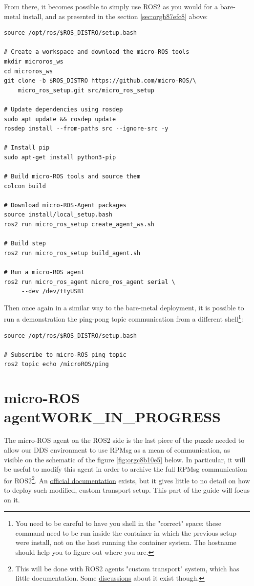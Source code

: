 \documentclass[10pt]{article}
\begin{document}
From there, it becomes possible to simply use ROS2 as you would for a bare-metal install,
and as presented in the section \ref{sec:orgb87efc8} above:
\begin{verbatim}
source /opt/ros/$ROS_DISTRO/setup.bash

# Create a workspace and download the micro-ROS tools
mkdir microros_ws
cd microros_ws
git clone -b $ROS_DISTRO https://github.com/micro-ROS/\
    micro_ros_setup.git src/micro_ros_setup

# Update dependencies using rosdep
sudo apt update && rosdep update
rosdep install --from-paths src --ignore-src -y

# Install pip
sudo apt-get install python3-pip

# Build micro-ROS tools and source them
colcon build

# Download micro-ROS-Agent packages
source install/local_setup.bash
ros2 run micro_ros_setup create_agent_ws.sh

# Build step
ros2 run micro_ros_setup build_agent.sh

# Run a micro-ROS agent
ros2 run micro_ros_agent micro_ros_agent serial \
     --dev /dev/ttyUSB1
\end{verbatim}

Then once again in a similar way to the bare-metal deployment,  it is possible to run a demonstration
the ping-pong topic communication from a different shell\footnote{You need to be careful to have you shell in the "correct" space: these command need to be run inside
the container in which the previous setup were install, not on the host running the container system.
The hostname should help you to figure out where you are.}:
\begin{verbatim}
source /opt/ros/$ROS_DISTRO/setup.bash

# Subscribe to micro-ROS ping topic
ros2 topic echo /microROS/ping
\end{verbatim}
\pagebreak


\section{micro-ROS agent\hfill{}\textsc{WORK\_IN\_PROGRESS}}
\label{sec:orgd723653}
The micro-ROS agent on the ROS2 side is the last piece of the puzzle needed to
allow our DDS environment to use RPMsg as a mean of communication, as visible
on the schematic of the figure \ref{fig:orgc8b10e5} below.
In particular, it will be useful to modify this agent in order to archive
the full RPMsg communication for ROS2\footnote{This will be done with ROS2 agents "custom transport"  system,
which has little documentation. Some \href{https://github.com/micro-ROS/micro\_ros\_setup/issues/383}{discussions} about it exist though.}.
An \href{https://micro.ros.org/docs/tutorials/advanced/create\_custom\_transports/}{official documentation} exists, but it gives little to no detail
on how to deploy such modified, custom transport setup.
This part of the guide will focus on it.
\end{document}
